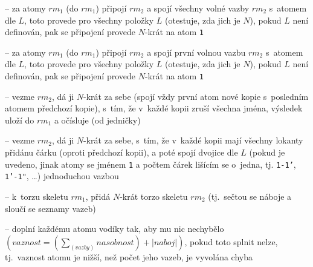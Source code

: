 \begin{itemize}
	 -- za atomy $rm_1$ (do $rm_1$) připojí
				$rm_2$ a spojí všechny volné vazby $rm_2$ s~atomem dle $L$, toto
				provede pro všechny položky $L$ (otestuje, zda jich je $N$),
				pokud $L$ není definován, pak se připojení provede $N$-krát na
				atom {\tt \til{}1\til{}}


	 -- za atomy $rm_1$ (do $rm_1$) připojí
				$rm_2$ a spojí první volnou vazbu $rm_2$ s~atomem dle $L$, toto
				provede pro všechny položky $L$ (otestuje, zda jich je $N$),
				pokud $L$ není definován, pak se připojení provede $N$-krát na
				atom {\tt \til{}1\til{}}


	 -- vezme $rm_2$, dá ji $N$-krát za sebe
				(spojí vždy první atom nové kopie s~posledním atomem předchozí
				kopie), s~tím, že v~každé kopii zruší všechna jména, výsledek
				uloží do $rm_1$ a očísluje (od jedničky)


	 -- vezme $rm_2$, dá ji $N$-krát za
				sebe, s~tím, že v~každé kopii mají všechny lokanty přidánu čárku
				(oproti předchozí kopii), a poté spojí dvojice dle $L$ (pokud je
				uvedeno, jinak atomy se jménem {\tt 1} a počtem čárek lišícím se
				o~jedna, tj. {\tt 1-1'}, {\tt 1'-1"}, \dots) jednoduchou vazbou


	 -- k~torzu skeletu $rm_1$, přidá $N$-krát
				torzo skeletu $rm_2$ (tj.~sečtou se náboje a sloučí se seznamy
				vazeb)


	 -- doplní každému atomu vodíky tak, aby mu nic nechybělo
				$\left( vaznost = \left(\sum_{(vazby)}nasobnost\right) + \left|naboj\right|\right)$,
				pokud toto splnit nelze, tj.~vaznost atomu je nižší, než počet jeho
				vazeb, je vyvolána chyba


\end{itemize}
